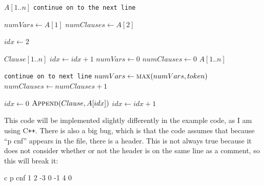 \begin{algorithm}[H]
\caption{Input parsing}\label{alg:2}
\begin{algorithmic}[1]

    \State  $A[1..n]$
            \State \texttt{continue on to the next line}
        \Else
                \State {}
            \EndFor
        \EndIf
    \EndFor

    \State $numVars \gets A[1]$
    \State $numClauses \gets A[2]$

    \State $idx \gets 2$

        \State $Clause[1..n]$
            \State $idx \gets idx + 1$
        \EndWhile
    \EndFor
\Else 
    \State $numVars \gets 0$
    \State $numClauses \gets 0$
    \State $A[1..n]$

            \State \texttt{continue on to next line}
        \Else
                \State $numVars \gets \Call{max}{numVars, token}$
                    \State $numClauses \gets numClauses + 1$
                \EndIf
            \EndFor
        \EndIf
    \EndFor

    \State $idx \gets 0$
            \State $\Call{Append}{Clause, A[idx]}$
            \State $idx \gets idx + 1$
        \EndWhile

    \EndFor
\EndIf

\EndProcedure
\end{algorithmic}
\end{algorithm}

This code will be implemented slightly differently in the example code, as I
am using C\verb|++|. There is also a big bug, which is that the code assumes that
because ``p cnf'' appears in the file, there is a header. This is not always true
because it does not consider whether or not the header is on the same line as a
comment, so this will break it:

\begin{FVerbatim}
c p cnf
1 2 -3 0
-1 4 0
\end{FVerbatim}

